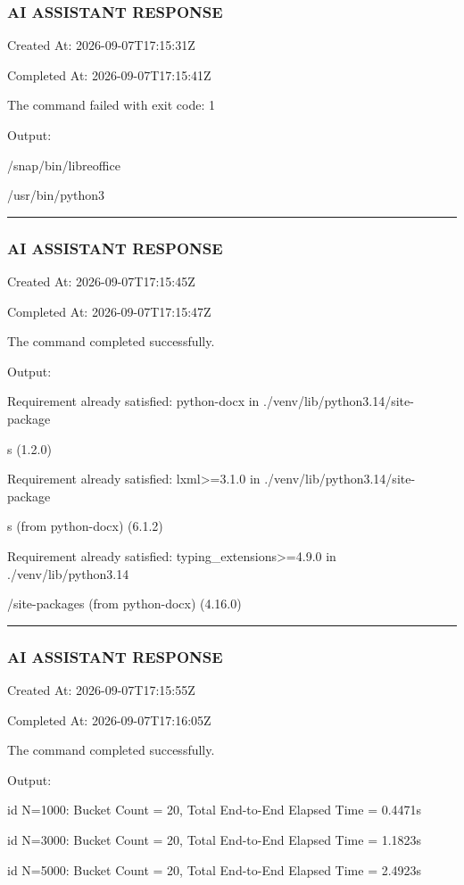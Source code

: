 \documentclass[11pt,a4paper]{article}
\begin{document}
\subsubsection{AI ASSISTANT RESPONSE}

Created At: 2026-09-07T17:15:31Z

Completed At: 2026-09-07T17:15:41Z


The command failed with exit code: 1

Output:

/snap/bin/libreoffice

/usr/bin/python3


\hrule

\subsubsection{AI ASSISTANT RESPONSE}

Created At: 2026-09-07T17:15:45Z

Completed At: 2026-09-07T17:15:47Z


The command completed successfully.

Output:

Requirement already satisfied: python-docx in ./venv/lib/python3.14/site-package

s (1.2.0)

Requirement already satisfied: lxml>=3.1.0 in ./venv/lib/python3.14/site-package

s (from python-docx) (6.1.2)

Requirement already satisfied: typing\_extensions>=4.9.0 in ./venv/lib/python3.14

/site-packages (from python-docx) (4.16.0)


\hrule

\subsubsection{AI ASSISTANT RESPONSE}

Created At: 2026-09-07T17:15:55Z

Completed At: 2026-09-07T17:16:05Z


The command completed successfully.

Output:

id N=1000: Bucket Count = 20, Total End-to-End Elapsed Time = 0.4471s

id N=3000: Bucket Count = 20, Total End-to-End Elapsed Time = 1.1823s

id N=5000: Bucket Count = 20, Total End-to-End Elapsed Time = 2.4923s
\end{document}
